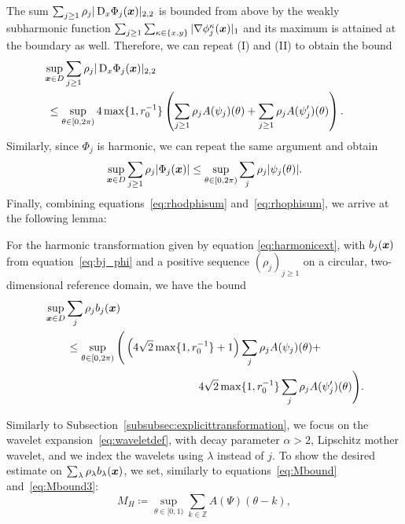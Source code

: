 The sum $\sum_{j \geq 1} \rho_j|\mathop{}\!\mathrm{D}_x\Phi_j({{\bm{x}}})|_{2,2} $ is bounded from above by the weakly subharmonic function $\sum_{j\geq 1}  \sum_{\kappa \in \{x, y\}}  |\nabla \phi_j^\kappa({{\bm{x}}})|_1$ and its maximum is attained at the boundary as well.
Therefore, we can repeat  (I) and (II) to obtain the bound
\begin{align}
    &\hspace{-20pt}\sup_{\x \in D}\sum_{j\geq 1} \rho_j |\D\Phi_j(\x)|_{2,2}  \nonumber\\
    &\hspace{-20pt}\,\,\leq \sup_{\theta \in [0,2\pi)}  4 \max\{1, r_0^{-1}\} \left(  \sum_{j \geq 1}\rho_j A(\psi_j)(\theta) + \sum_{j \geq 1}\rho_j A(\psi_j')(\theta) \right). \label{eq:rhodphisum}
\end{align}
Similarly, since $\Phi_j$ is harmonic, we can repeat the same argument and obtain
\begin{align}
    \sup_{{{\bm{x}}} \in D}\sum_{j\geq 1} \rho_j |\Phi_j({{\bm{x}}})|\leq \sup_{\theta \in [0,2\pi)} \sum_j \rho_j |\psi_j(\theta)|.\label{eq:rhophisum}
\end{align}
Finally, combining equations~\eqref{eq:rhodphisum} and~\eqref{eq:rhophisum}, we arrive at the following lemma:
\begin{lemma}\label{lem:harmboundbj}
For the harmonic transformation given by equation \eqref{eq:harmonicext}, with $b_j({{\bm{x}}})$ from equation~\eqref{eq:bj_phi} and a positive sequence $(\rho_j)_{j \geq 1}$ on a circular, two-dimensional reference domain, we have the bound
\begin{align*}
    &\sup_{{{\bm{x}}} \in D}\sum_j \rho_j b_j({{\bm{x}}}) \\ &\qquad\leq \sup_{\theta \in [0,2\pi)} \Bigg( \left(4\sqrt{2} \max\{1, r_0^{-1}\} + 1\right) \sum_{j}\rho_j A(\psi_j)(\theta) + \\  &\qquad\qquad\qquad\qquad\qquad\qquad\qquad4\sqrt{2} \max\{1, r_0^{-1}\} \sum_{j}\rho_j A(\psi_j')(\theta) \Bigg).
\end{align*}
\end{lemma}
Similarly to Subsection~\ref{subsubsec:explicittransformation}, we focus on the wavelet expansion~\eqref{eq:waveletdef}, with decay parameter $\alpha>2$, Lipschitz mother wavelet, and we index the wavelets using $\lambda$ instead of $j$.
To show the desired estimate on $\sum_{\lambda} \rho_\lambda b_\lambda ({{\bm{x}}})$, we set, similarly to equations~\eqref{eq:Mbound} and~\eqref{eq:Mbound3}:
\begin{equation}
    M_H\coloneqq\sup_{\theta \in [0,1)} \sum_{k \in \mathbb{Z}}A(\Psi)(\theta - k), \label{eq:Mbound2}
\end{equation}

